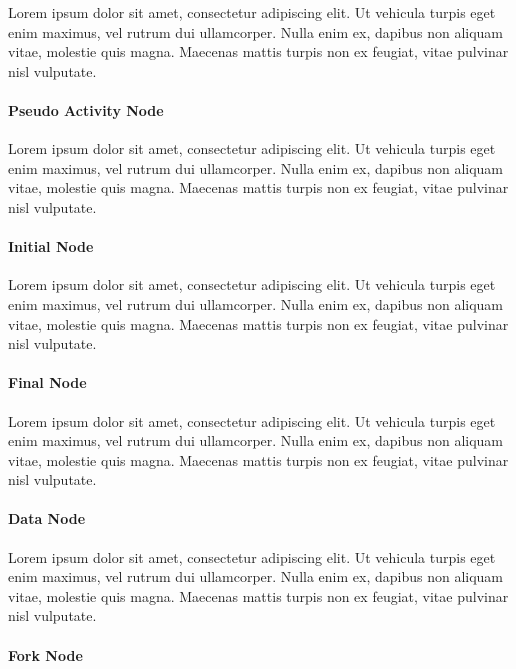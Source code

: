 Lorem ipsum dolor sit amet, consectetur adipiscing elit. Ut vehicula turpis eget enim maximus, vel rutrum dui ullamcorper. Nulla enim ex, dapibus non aliquam vitae, molestie quis magna. Maecenas mattis turpis non ex feugiat, vitae pulvinar nisl vulputate.

\paragraph{Pseudo Activity Node}

Lorem ipsum dolor sit amet, consectetur adipiscing elit. Ut vehicula turpis eget enim maximus, vel rutrum dui ullamcorper. Nulla enim ex, dapibus non aliquam vitae, molestie quis magna. Maecenas mattis turpis non ex feugiat, vitae pulvinar nisl vulputate.

\paragraph{Initial Node}

Lorem ipsum dolor sit amet, consectetur adipiscing elit. Ut vehicula turpis eget enim maximus, vel rutrum dui ullamcorper. Nulla enim ex, dapibus non aliquam vitae, molestie quis magna. Maecenas mattis turpis non ex feugiat, vitae pulvinar nisl vulputate.

\paragraph{Final Node}

Lorem ipsum dolor sit amet, consectetur adipiscing elit. Ut vehicula turpis eget enim maximus, vel rutrum dui ullamcorper. Nulla enim ex, dapibus non aliquam vitae, molestie quis magna. Maecenas mattis turpis non ex feugiat, vitae pulvinar nisl vulputate.

\paragraph{Data Node}

Lorem ipsum dolor sit amet, consectetur adipiscing elit. Ut vehicula turpis eget enim maximus, vel rutrum dui ullamcorper. Nulla enim ex, dapibus non aliquam vitae, molestie quis magna. Maecenas mattis turpis non ex feugiat, vitae pulvinar nisl vulputate.

\paragraph{Fork Node}

